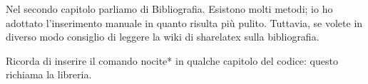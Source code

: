Nel secondo capitolo parliamo di Bibliografia. Esistono molti metodi; io ho adottato l'inserimento manuale in quanto risulta più pulito. Tuttavia, se volete in diverso modo consiglio di leggere la wiki di sharelatex sulla bibliografia.

Ricorda di inserire il comando nocite{*} in qualche capitolo del codice: questo richiama la libreria.
\nocite{*}